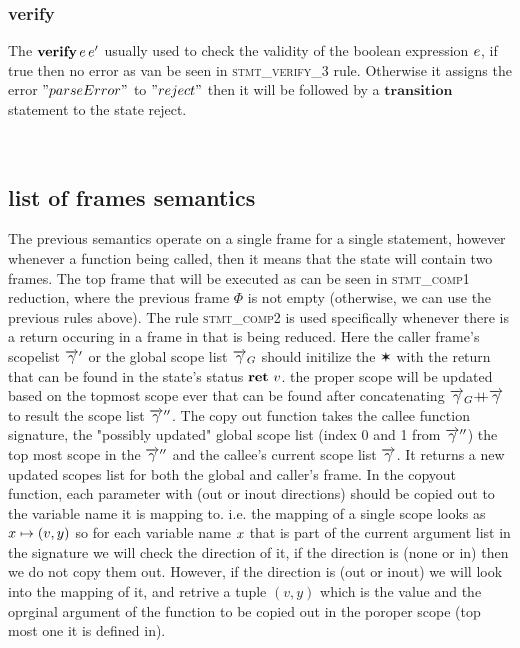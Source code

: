 \documentclass[UTF8]{article}
\begin{document}
\subsubsection*{verify}
The $\mathbf{verify} \, e \, e'$ usually used to check the validity of the boolean expression $e$, if true then no error as van be seen in \textsc{stmt\_verify\_3} rule. Otherwise it assigns the error $"parseError"$ to $"reject"$ then it will be followed by a $\mathbf{transition}$ statement to the state reject.
 

\begin{figure}[ht!]
    \ottusedrule{\ottdrulestmtXXverifyXXThree{}} \\
    \ottusedrule{\ottdrulestmtXXverifyXXFour{}} 
\end{figure}



\subsection{list of frames semantics}
The previous semantics operate on a single frame for a single statement, however whenever a function being called, then it means that the state will contain two frames. The top frame that will be executed as can be seen in \textsc{stmt\_comp1} reduction, where the previous frame $\Phi$ is not empty (otherwise, we can use the previous rules above). 
The rule \textsc{stmt\_comp2} is used specifically whenever there is a return occuring in a frame in that is being reduced. Here the caller frame's scopelist $\overrightarrow{\gamma}'$ or the global scope list $\overrightarrow{\gamma}_G$ should initilize the $\varstar$ with the return that can be found in the state's status $\textbf{ret}\,\, v$. the proper scope will be updated based on the topmost scope ever that can be found after concatenating $\overrightarrow{\gamma}_G {+}\mspace{-8mu}{+} \overrightarrow{\gamma}$ to result the scope list $\overrightarrow{\gamma}''$.
The copy out function takes the callee function signature, the "possibly updated" global scope list (index 0 and 1 from $\overrightarrow{\gamma}''$) the top most scope in the $\overrightarrow{\gamma}''$ and the callee's current scope list $\overrightarrow{\gamma}$. It returns a new updated scopes list for both the global and caller's frame. 
In the copyout function, each parameter with (out or inout directions) should be copied out to the variable name it is mapping to. i.e. the mapping of a single scope looks as  $ x \mapsto (v , y) $ so for each variable name $x$ that is part of the current argument list in the signature we will check the direction of it, if the direction is (none or in) then we do not copy them out. However, if the direction is (out or inout) we will look into the mapping of it, and retrive a tuple $(v,y)$ which is the value and the oprginal argument of the function to be copied out in the poroper scope (top most one it is defined in).
\end{document}
